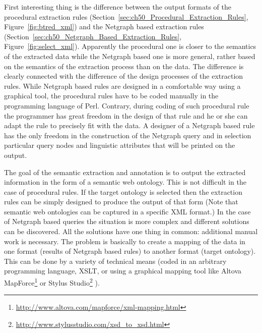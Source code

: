 First interesting thing is the difference between the output formats of the procedural extraction rules (Section~\ref{sec:ch50_Procedural_Extraction_Rules}, Figure~\ref{fig:btred_xml}) and the Netgraph based extraction rules (Section~\ref{sec:ch50_Netgraph_Based_Extraction_Rules}, Figure~\ref{fig:select_xml}). Apparently the procedural one is closer to the semantics of the extracted data while the Netgraph based one is more general, rather based on the semantics of the extraction process than on the data. The difference is clearly connected with the difference of the design processes of the extraction rules. While Netgraph based rules are designed in a comfortable way using a graphical tool, the procedural rules have to be coded manually in the programming language of Perl. Contrary, during coding of such procedural rule the programmer has great freedom in the design of that rule and he or she can adapt the rule to precisely fit with the data. A designer of a Netgraph based rule has the only freedom in the construction of the Netgraph query and in selection particular query nodes and linguistic attributes that will be printed on the output.

The goal of the semantic extraction and annotation is to output the extracted information in the form of a semantic web ontology. This is not difficult in the case of procedural rules. If the target ontology is selected then the extraction rules can be simply designed to produce the output of that form (Note that semantic web ontologies can be captured in a specific XML format.) In the case of Netgraph based queries the situation is more complex and different solutions can be discovered. All the solutions have one thing in common: additional manual work is necessary. The problem is basically to create a mapping of the data in one format (results of Netgraph based rules) to another format (target ontology). This can be done by a variety of technical means (coded in an arbitrary programming language, XSLT, or using a graphical mapping tool like 
Altova MapForce\footnote{\url{http://www.altova.com/mapforce/xml-mapping.html}}
or
Stylus Studio\footnote{\url{http://www.stylusstudio.com/xsd_to_xsd.html}}
). 



